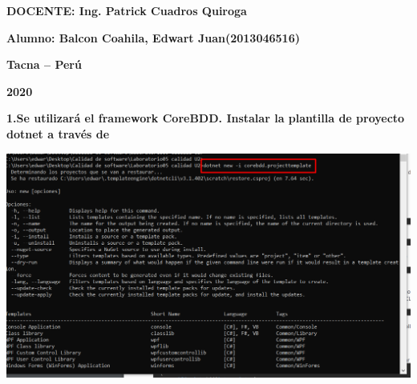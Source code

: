 \documentclass{article}
\begin{document}
\begin{titlepage}
\begin{center}
\vspace*{0.3in}
\begin{Large}
\textbf{DOCENTE: Ing. Patrick Cuadros Quiroga} \\
\end{Large}

\vspace*{0.2in}
\vspace*{0.1in}
\begin{large}

\begin{Large}
\textbf{Alumno: Balcon Coahila, Edwart Juan\hfill	(2013046516) } \\
\end{Large}

\vspace*{0.15in}
\begin{Large}
\textbf{Tacna – Perú} \\
\end{Large}

\vspace*{0.05in}
\begin{Large}
\textbf{2020 } \\
\end{Large}

\end{large}
\end{center}

\end{titlepage}


\newpage


\textbf{1.Se utilizará el framework CoreBDD. Instalar la plantilla de proyecto dotnet a través de}

    \begin{center}
		\includegraphics[width=15cm]{./images/1} 
	\end{center}
	
\end{document}

